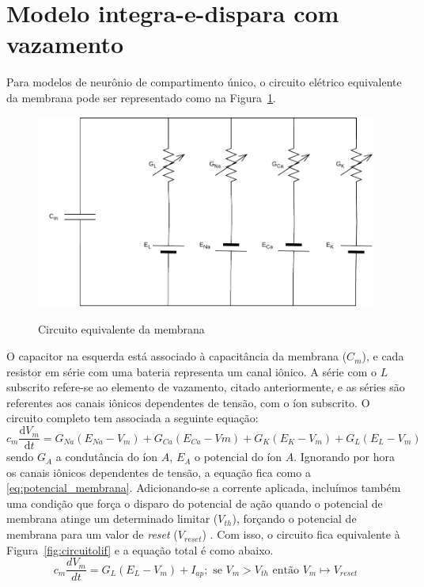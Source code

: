 \section{Modelo integra-e-dispara com vazamento}\label{sec:modelolif}

Para modelos de neurônio de compartimento único, o circuito elétrico equivalente da membrana pode ser representado como na Figura~\ref{fig:circuitomembrana}.
\begin{figure}[htb!]
	\centering
	\caption{Circuito equivalente da membrana}
	\label{fig:circuitomembrana}
	\includegraphics[width=0.7\linewidth]{figs/circuito_membrana}\\
\end{figure}
O capacitor na esquerda está associado à capacitância da membrana ($C_m$), e cada resistor em série com uma bateria representa um canal iônico. A série com o $L$ subscrito refere-se ao elemento de vazamento, citado anteriormente, e as séries são referentes aos canais iônicos dependentes de tensão, com o íon subscrito. O circuito completo tem associada a seguinte equação:
\begin{equation}\label{eq:potencial_membrana_total}
	c_m\frac{\mathrm{d}V_m}{\mathrm{d}t}=G_{Na}(E_{Na}-V_m)+G_{Ca}(E_{Ca}-Vm)+G_K(E_K-V_m)+G_L(E_L-V_m)
\end{equation}
sendo $G_A$ a condutância do íon $A$, $E_A$ o potencial do íon $A$. Ignorando por hora os canais iônicos dependentes de tensão, a equação fica como a \ref{eq:potencial_membrana}. Adicionando-se a corrente aplicada, incluímos também uma condição que força o disparo do potencial de ação quando o potencial de membrana atinge um determinado limitar ($V_{th}$), forçando o potencial de membrana para um valor de \textit{reset} ($V_{reset}$) \cite{miller_introductory_2018}. Com isso, o circuito fica equivalente à Figura~\ref{fig:circuitolif} e a equação total é como abaixo.
\begin{equation}\label{eq:lif}
	c_m\frac{dV_m}{dt} = G_L(E_L-V_m)+I_{ap}; \text{ se } V_m > V_{th} \text{ então } V_m\mapsto V_{reset}
\end{equation}
